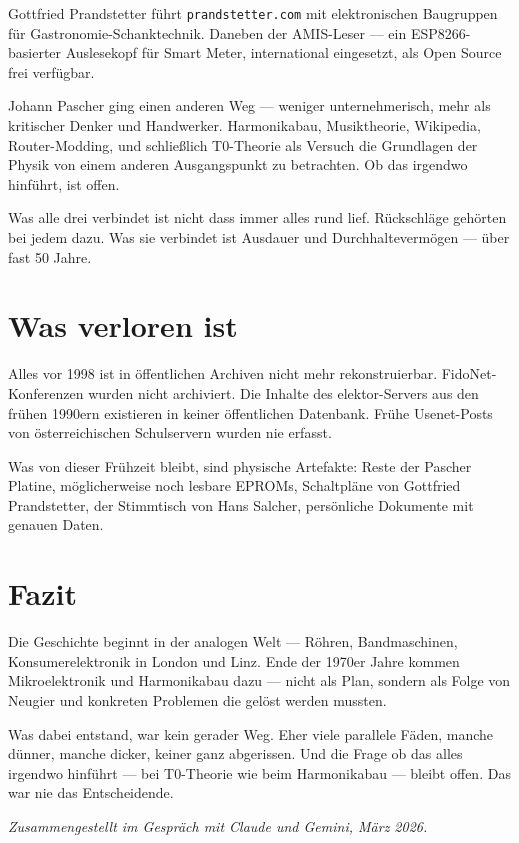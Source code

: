 \documentclass[11pt]{report}
\begin{document}
Gottfried Prandstetter führt \texttt{prandstetter.com} mit elektronischen Baugruppen für Gastronomie-Schanktechnik. Daneben der AMIS-Leser --- ein ESP8266-basierter Auslesekopf für Smart Meter, international eingesetzt, als Open Source frei verfügbar.

Johann Pascher ging einen anderen Weg --- weniger unternehmerisch, mehr als kritischer Denker und Handwerker. Harmonikabau, Musiktheorie, Wikipedia, Router-Modding, und schließlich T0-Theorie als Versuch die Grundlagen der Physik von einem anderen Ausgangspunkt zu betrachten. Ob das irgendwo hinführt, ist offen.

Was alle drei verbindet ist nicht dass immer alles rund lief. Rückschläge gehörten bei jedem dazu. Was sie verbindet ist Ausdauer und Durchhaltevermögen --- über fast 50 Jahre.

\section{Was verloren ist}

Alles vor 1998 ist in öffentlichen Archiven nicht mehr rekonstruierbar. FidoNet-Konferenzen wurden nicht archiviert. Die Inhalte des elektor-Servers aus den frühen 1990ern existieren in keiner öffentlichen Datenbank. Frühe Usenet-Posts von österreichischen Schulservern wurden nie erfasst.

Was von dieser Frühzeit bleibt, sind physische Artefakte: Reste der Pascher Platine, möglicherweise noch lesbare EPROMs, Schaltpläne von Gottfried Prandstetter, der Stimmtisch von Hans Salcher, persönliche Dokumente mit genauen Daten.

\section{Fazit}

Die Geschichte beginnt in der analogen Welt --- Röhren, Bandmaschinen, Konsumerelektronik in London und Linz. Ende der 1970er Jahre kommen Mikroelektronik und Harmonikabau dazu --- nicht als Plan, sondern als Folge von Neugier und konkreten Problemen die gelöst werden mussten.

Was dabei entstand, war kein gerader Weg. Eher viele parallele Fäden, manche dünner, manche dicker, keiner ganz abgerissen. Und die Frage ob das alles irgendwo hinführt --- bei T0-Theorie wie beim Harmonikabau --- bleibt offen. Das war nie das Entscheidende.

\bigskip
\textit{Zusammengestellt im Gespräch mit Claude und Gemini, März 2026.}
\end{document}
